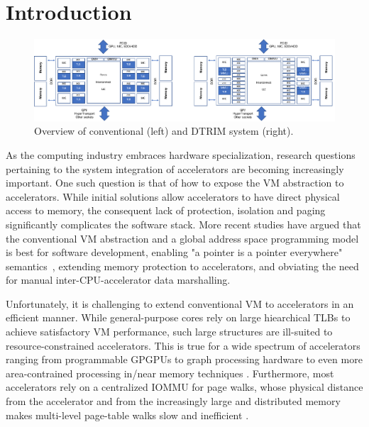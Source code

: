 \section{Introduction}
\label{sec:intro}

\begin{figure}
\centering
 \includegraphics[width=1\textwidth,clip]{figures/overview.pdf}
 \caption{Overview of conventional (left) and DTRIM system (right).}
\label{fig:overview}
\end{figure}

As the computing industry embraces hardware specialization, research
questions pertaining to the system integration of accelerators are
becoming increasingly important. One such question is that of how to
expose the VM abstraction to accelerators. While initial solutions
allow accelerators to have direct physical access to memory, the
consequent lack of protection, isolation and paging significantly
complicates the software stack. More recent studies have argued that
the conventional VM abstraction and a global address space programming
model is best for software development, enabling "a pointer is a
pointer everywhere" semantics~\cite{pichai:architectural,
  power:supporting, haria:devirtualizing, vesely:observation,
  ausavarungnirun:mosaic}, extending memory protection to
accelerators, and obviating the need for manual inter-CPU-accelerator
data marshalling.

Unfortunately, it is challenging to extend conventional VM to
accelerators in an efficient manner. While general-purpose cores rely
on large hiearchical TLBs to achieve satisfactory VM performance, such
large structures are ill-suited to resource-constrained
accelerators. This is true for a wide spectrum of accelerators ranging
from programmable GPGPUs \cite{pichai:architectural, power:supporting}
to graph processing hardware \cite{haria:devirtualizing} to even more
area-contrained processing in/near memory techniques
\cite{picorel:near-memory}. Furthermore, most accelerators rely on a
centralized IOMMU for page walks, whose physical distance from the
accelerator and from the increasingly large and distributed memory
makes multi-level page-table walks slow and inefficient \cite{shin:scheduling}.



